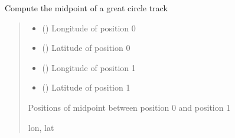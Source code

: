 \documentclass[letterpaper,10pt,english]{sphinxmanual}
\begin{document}
\begin{fulllineitems}
\label{\detokenize{users_guide:GeoSpatialTools.distance_metrics.midpoint}}
\pysigstartsignatures
{}
\pysigstopsignatures
\sphinxAtStartPar
Compute the midpoint of a great circle track
\begin{quote}\begin{description}
\begin{itemize}
\item {} 
\sphinxAtStartPar
{} () \textendash{} Longitude of position 0

\item {} 
\sphinxAtStartPar
{} () \textendash{} Latitude of position 0

\item {} 
\sphinxAtStartPar
{} () \textendash{} Longitude of position 1

\item {} 
\sphinxAtStartPar
{} () \textendash{} Latitude of position 1

\end{itemize}

\sphinxAtStartPar
Positions of midpoint between position 0 and position 1

\sphinxAtStartPar
lon, lat

\end{description}\end{quote}

\end{fulllineitems}
\end{document}
